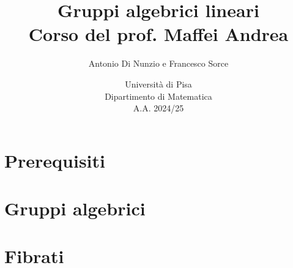 \documentclass[a4paper]{report}
\title{Gruppi algebrici lineari\\
\large Corso del prof. Maffei Andrea}
\author{Antonio Di Nunzio
 e Francesco Sorce}
\date{Università di Pisa\\
Dipartimento di Matematica\\
A.A. 2024/25}
\begin{document}
\maketitle

\tableofcontents
\newpage


\part{Prerequisiti}


\part{Gruppi algebrici}



\part{Fibrati}


\end{document}
